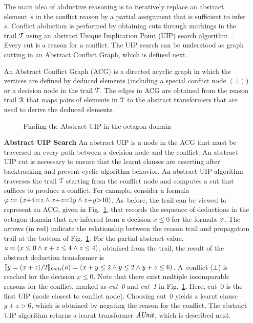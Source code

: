 The main idea of abductive reasoning is to iteratively replace an abstract
element~$s$ in the conflict reason by a partial assignment that is sufficient 
to infer~$s$.  Conflict abduction is performed by obtaining cuts through markings 
in the trail $\mathcal{T}$ using an abstract Unique Implication Point (UIP) 
search algorithm~\cite{cdcl}.  Every cut is a reason for a conflict.  The UIP
search can be understood as graph cutting in an Abstract Conflict
Graph, which is defined next. 
%
\begin{definition}
  An Abstract Conflict Graph (ACG) is a directed acyclic graph in
  which the vertices are defined by deduced elements (including a
  special conflict node $(\bot)$) or a decision node in the trail
  $\mathcal{T}$.  The edges in ACG are obtained from the reason trail
  $\mathcal{R}$ that maps pairs of elements in $\mathcal{T}$ to the abstract
  transformers that are used to derive the deduced elements.  
\end{definition}

\begin{figure}[t]
\centering
{}
\caption{\label{uip}Finding the Abstract UIP in the octagon domain}
\end{figure}  

\noindent \textbf{Abstract UIP Search}
An abstract UIP is a node in the ACG that must be traversed on every path between a 
decision node and the conflict. An abstract UIP cut is necessary to ensure that
the learnt clauses are asserting after backtracking and prevent cyclic algorithm
behavior. 
An abstract UIP algorithm~\cite{DBLP:journals/fmsd/BrainDGHK14} traverses
the trail $\mathcal{T}$ starting from the conflict node and computes a cut that
suffices to produce a conflict.  For example, consider a formula $\varphi:=
(x{+}4{=}z \wedge x{+}z{=}2y \wedge z{+}y{>}10)$.  As~before, the trail can be
viewed to represent an ACG, given in Fig.~\ref{uip}, that records the 
sequence of deductions in the octagon domain that are inferred
from a decision $x {\leq} 0$ for the formula $\varphi$.  The arrows (in
red) indicate the relationship between the reason trail and propagation trail
at the bottom of Fig.~\ref{uip}.  For the partial abstract value,
$\mathit{a}=(x\leq0 \wedge x+z\leq4 \wedge z\leq4)$, obtained from the trail,
the result of the abstract deduction transformer is
$\llbracket y=(x+z)/2 \rrbracket_{\mathit{Octs}}(\mathit{a})=(x+y\leq2 \wedge y\leq2 \wedge y+z\leq6)$. 
A~conflict ($\bot$) is reached for the decision ${x{\leq}0}$.  Note that
there exist multiple incomparable reasons for the conflict, marked as {\em cut~0}
and {\em cut~1} in Fig.~\ref{uip}.  Here, cut~0 is the first UIP (node closest
to conflict node).  Choosing cut~0 yields a learnt clause $y+z>6$, which is
obtained by negating the reason for the conflict.  The abstract UIP algorithm
returns a learnt transformer $\mathit{AUnit}$, which is described next.\\
%

